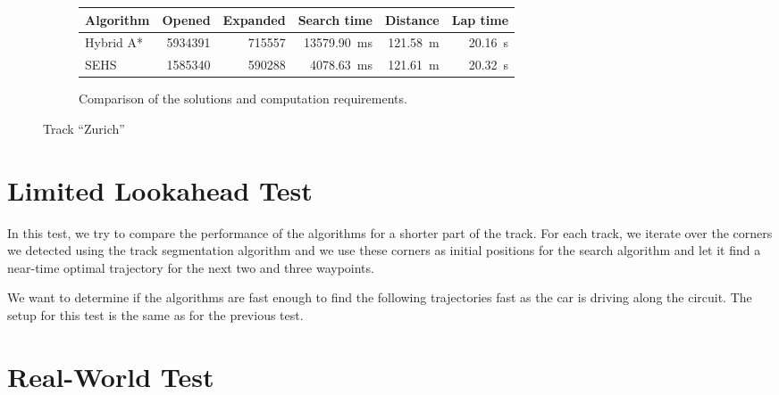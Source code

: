 \begin{figure}[!tbp]
	\vspace{0.75cm}
	
	\begin{subfigure}[t]{\textwidth}
		\centering
		\begin{tabular}{l r r r r r}%
			\toprule
			Algorithm & Opened & Expanded & Search time & Distance & Lap time \\
			\midrule
			Hybrid A* & \num{5934391} & \num{715557} & \SI{13579.90}{\milli\second} & \bftab \SI{121.58}{\meter} & \bftab \SI{20.16}{\second} \\
			SEHS & \bftab \num{1585340} & \bftab \num{590288} & \bftab \SI{4078.63}{\milli\second} & \SI{121.61}{\meter} & \SI{20.32}{\second} \\
			\bottomrule
		\end{tabular}
		\caption{Comparison of the solutions and computation requirements.}
		\label{table:zurich}
	\end{subfigure}
	
	\vspace{0.75cm}

	\caption{Track ``Zurich''}
	\label{fig:zurich}
\end{figure}

\section{Limited Lookahead Test}

In this test, we try to compare the performance of the algorithms for a shorter part of the track. For each track, we iterate over the corners we detected using the track segmentation algorithm and we use these corners as initial positions for the search algorithm and let it find a near-time optimal trajectory for the next two and three waypoints.

We want to determine if the algorithms are fast enough to find the following trajectories fast as the car is driving along the circuit. The setup for this test is the same as for the previous test.


\section{Real-World Test}

